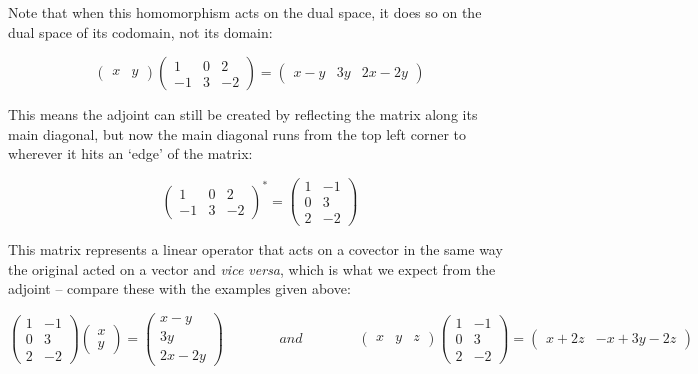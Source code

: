 \documentclass[oneside,english]{amsbook}
\numberwithin{section}{chapter}
\theoremstyle{plain}
\theoremstyle{definition}
\begin{document}
Note that when this homomorphism acts on the dual space, it does so on
the dual space of its codomain, not its domain:

\[\begin{pmatrix}
	x & y
\end{pmatrix}\begin{pmatrix}
	1 & 0 & 2 \\
	- 1 & 3 & - 2
\end{pmatrix} = \begin{pmatrix}
	x - y & 3y & 2x - 2y
\end{pmatrix}\]

This means the adjoint can still be created by reflecting the matrix
along its main diagonal, but now the main diagonal runs from the top
left corner to wherever it hits an `edge' of the matrix:

\[\begin{pmatrix}
	1 & 0 & 2 \\
	- 1 & 3 & - 2
\end{pmatrix}^{*} = \begin{pmatrix}
	1 & - 1 \\
	0 & 3 \\
	2 & - 2
\end{pmatrix}\]

This matrix represents a linear operator that acts on a covector in the
same way the original acted on a vector and \emph{vice versa}, which is
what we expect from the adjoint -- compare these with the examples given
above:

\[\begin{pmatrix}
	1 & - 1 \\
	0 & 3 \\
	2 & - 2
\end{pmatrix}\begin{pmatrix}
	x \\
	y
\end{pmatrix} = \begin{pmatrix}
	x - y \\
	3y \\
	2x - 2y
\end{pmatrix}\ \ \ \ \ \ \ \ \ \ \ \ \ \ \ \ \ \ and\ \ \ \ \ \ \ \ \ \ \ \ \ \ \ \ \ \ \begin{pmatrix}
	x & y & z
\end{pmatrix}\begin{pmatrix}
	1 & - 1 \\
	0 & 3 \\
	2 & - 2
\end{pmatrix} = \begin{pmatrix}
	x + 2z & - x + 3y - 2z
\end{pmatrix}\]
\end{document}

